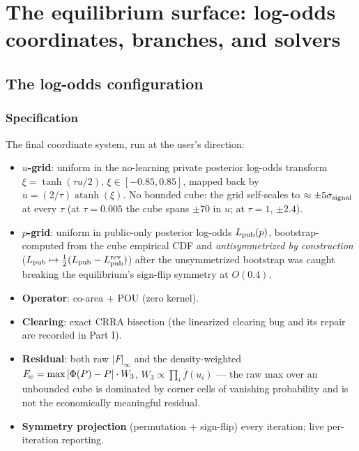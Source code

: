 \part{The equilibrium surface: log-odds coordinates, branches, and solvers}

\chapter{The log-odds configuration}

\section{Specification}
The final coordinate system, run at the user's direction:
\begin{itemize}\itemsep2pt
  \item \textbf{$u$-grid}: uniform in the no-learning private posterior
        log-odds transform $\xi = \tanh(\tau u / 2)$,
        $\xi \in [-0.85, 0.85]$, mapped back by
        $u = (2/\tau)\operatorname{atanh}(\xi)$. No bounded cube: the
        grid self-scales to $\approx \pm 5\sigma_{\rm signal}$ at every
        $\tau$ (at $\tau = 0.005$ the cube spans $\pm 70$ in $u$; at
        $\tau = 1$, $\pm 2.4$).
  \item \textbf{$p$-grid}: uniform in public-only posterior log-odds
        $L_{\rm pub}(p)$, bootstrap-computed from the cube empirical CDF and
        \emph{antisymmetrized by construction}
        ($L_{\rm pub} \mapsto \tfrac12(L_{\rm pub} - L_{\rm pub}^{\rm rev})$) after the
        unsymmetrized bootstrap was caught breaking the equilibrium's
        sign-flip symmetry at $O(0.4)$.
  \item \textbf{Operator}: \strict{} co-area + POU (zero kernel).
  \item \textbf{Clearing}: exact CRRA bisection (the linearized
        clearing bug and its repair are recorded in Part I).
  \item \textbf{Residual}: both raw $|F|_\infty$ and the
        density-weighted $F_{\!w} = \max |\Phi(P) - P| \cdot W_3$,
        $W_3 \propto \prod_i \bar f(u_i)$ --- the raw max over an
        unbounded cube is dominated by corner cells of vanishing
        probability and is not the economically meaningful residual.
  \item \textbf{Symmetry projection} (permutation + sign-flip) every
        iteration; live per-iteration reporting.
\end{itemize}

